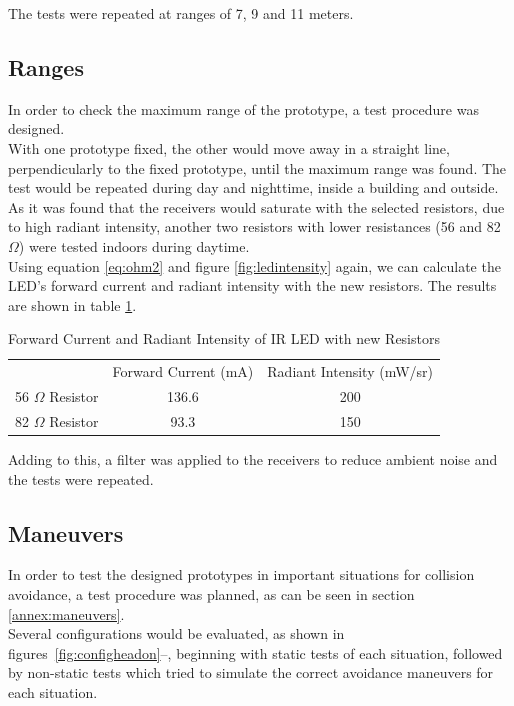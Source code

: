 The tests were repeated at ranges of 7, 9 and 11 meters.\\

\subsection{Ranges}
\label{subsection:ranges}
In order to check the maximum range of the prototype, a test procedure was designed.\\
With one prototype fixed, the other would move away in a straight line, perpendicularly to the fixed prototype, until the maximum range was found. The test would be repeated during day and nighttime, inside a building and outside.\\ 

As it was found that the receivers would saturate with the selected resistors, due to high radiant intensity, another two resistors with lower resistances (56 and 82 $\Omega$) were tested indoors during daytime.\\
Using equation \eqref{eq:ohm2} and figure \ref{fig:ledintensity} again, we can calculate the LED's forward current and radiant intensity with the new resistors. The results are shown in table \ref{tab:ledintensity2}.\\
\begin{table}[]
\centering
\caption[Forward Current and Radiant Intensity of IR LED with new Resistors]{Forward Current and Radiant Intensity of IR LED with new Resistors}
\label{tab:ledintensity2}
\begin{tabular}{@{}ccc@{}}
\toprule
                     & Forward Current (mA) & Radiant Intensity (mW/sr) \\ \cmidrule(l){2-3}
56 $\Omega$ Resistor & 136.6                & 200                       \\
82 $\Omega$ Resistor & 93.3                 & 150                       \\ \bottomrule
\end{tabular}
\end{table}

Adding to this, a filter was applied to the receivers to reduce ambient noise and the tests were repeated.\\

\subsection{Maneuvers}
\label{subsection:maneuvers}
In order to test the designed prototypes in important situations for collision avoidance, a test procedure was planned, as can be seen in section \ref{annex:maneuvers}.\\
Several configurations would be evaluated, as shown in figures~\ref{fig:configheadon}--, beginning with static tests of each situation, followed by non-static tests which tried to simulate the correct avoidance maneuvers for each situation.\\ 

